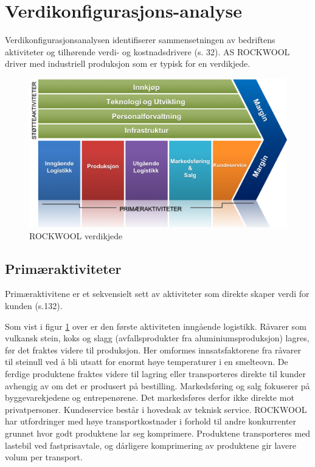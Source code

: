 \section{Verdikonfigurasjons-analyse}
Verdikonfigurasjonsanalysen identifiserer sammensetningen av bedriftens aktiviteter og tilhørende verdi- og kostnadsdrivere (s. 32). AS ROCKWOOL driver med industriell produksjon som er typisk for en verdikjede.

\begin{figure}[H]
\centering
\includegraphics [scale=0.5]{bilder/verdikjede.png}
\caption{ROCKWOOL verdikjede}
\label{fig:verdikjede}
\end{figure}

\subsection{Primæraktiviteter}
Primæraktivitene er et sekvensielt sett av aktiviteter som direkte skaper verdi for kunden (s.132). 
 
\indent \newline
Som vist i figur \ref{fig:verdikjede} over er den første aktiviteten inngående logistikk. Råvarer som vulkansk stein, koks og slagg (avfallsprodukter fra aluminiumsproduksjon) lagres, før det fraktes videre til produksjon. Her omformes innsatsfaktorene fra råvarer til steinull ved å bli utsatt for enormt høye temperaturer i en smelteovn. De ferdige produktene fraktes videre til lagring eller transporteres direkte til kunder avhengig av om det er produsert på bestilling. Markedsføring og salg fokuserer på byggevarekjedene og entrepenørene. Det markedsføres derfor ikke direkte mot privatpersoner. Kundeservice består i hovedsak av teknisk service.
ROCKWOOL har utfordringer med høye transportkostnader i forhold til andre konkurrenter grunnet hvor godt produktene lar seg komprimere. Produktene transporteres med lastebil ved fastprisavtale, og dårligere komprimering av produktene gir lavere volum per transport. 

